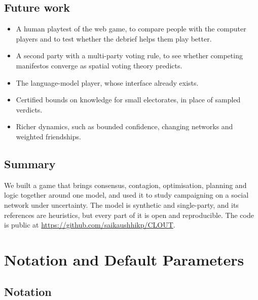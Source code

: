 \documentclass[11pt,a4paper,oneside]{report}
\newcommand{\repo}{\url{https://github.com/saikaushhikp/CLOUT}}
\newcommand{\summarysection}{\section{Summary}}
\begin{document}
\section{Future work}

\begin{itemize}
  \item A human playtest of the web game, to compare people with the computer players and to test whether
        the debrief helps them play better.
  \item A second party with a multi-party voting rule, to see whether competing manifestos converge as
        spatial voting theory predicts.
  \item The language-model player, whose interface already exists.
  \item Certified bounds on knowledge for small electorates, in place of sampled verdicts.
  \item Richer dynamics, such as bounded confidence, changing networks and weighted friendships.
\end{itemize}

\summarysection

We built a game that brings consensus, contagion, optimisation, planning and logic together around one
model, and used it to study campaigning on a social network under uncertainty. The model is synthetic and
single-party, and its references are heuristics, but every part of it is open and reproducible. The code
is public at \repo.

\clearpage
{}
\nocite{degroot1974,friedkin1990,leblanc2013,kempe2003,boyd2011,fagin1995,bond2012,gerber2000,guardian2018,cms2019}



\appendix

\chapter{Notation and Default Parameters}\label{app:notation}

\section*{Notation}
\end{document}
